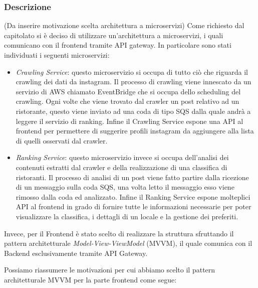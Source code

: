 \subsubsection{Descrizione}
(Da inserire motivazione scelta architettura a microservizi)
Come richiesto dal capitolato si è deciso di utilizzare un'architettura a microservizi, i quali comunicano con il frontend tramite API gateway.
In particolare sono stati individuati i seguenti microservizi:
\begin{itemize}
    \item \textit{Crawling Service}: questo microservizio si occupa di tutto ciò che riguarda il crawling dei dati da instagram. Il processo di crawling viene innescato da un servizio di AWS chiamato EventBridge che si occupa dello scheduling del crawling. Ogni volte che viene trovato dal crawler un post relativo ad un ristorante, questo viene inviato ad una coda di tipo SQS dalla quale andrà a leggere il servizio di ranking. Infine il Crawling Service espone una API al frontend per permettere di suggerire profili instagram da aggiungere alla lista di quelli osservati dal crawler.
    \item \textit{Ranking Service}: questo microservizio invece si occupa dell'analisi dei contenuti estratti dal crawler e della realizzazione di una classifica di ristoranti. Il processo di analisi di un post viene fatto partire dalla ricezione di un messaggio sulla coda SQS, una volta letto il messaggio esso viene rimosso dalla coda ed analizzato. Infine il Ranking Service espone molteplici API al frontend in grado di fornire tutte le informazioni necessarie per poter visualizzare la classifica, i dettagli di un locale e la gestione dei preferiti.
\end{itemize}

Invece, per il Frontend è stato scelto di realizzare la struttura sfruttando il pattern architetturale \textit{Model-View-ViewModel} (MVVM), il quale comunica con il Backend esclusivamente tramite API Gateway.

Possiamo riassumere le motivazioni per cui abbiamo scelto il pattern architetturale MVVM per la parte frontend come segue:

